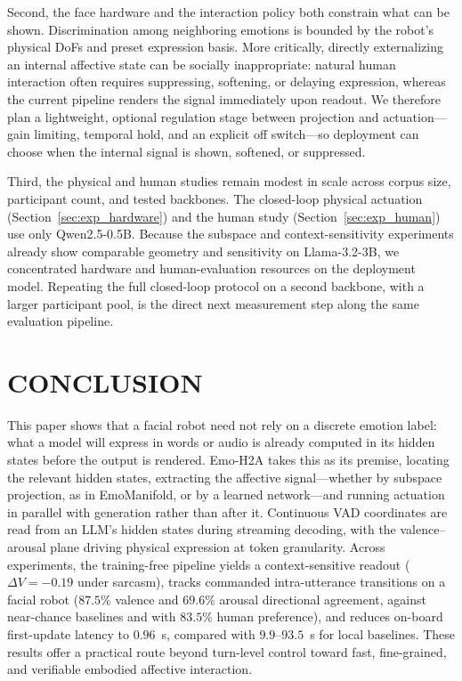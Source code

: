\documentclass[letterpaper, 10 pt, conference]{ieeeconf}
\begin{document}
\addtolength{\textheight}{-4.5cm}

Second, the face hardware and the interaction policy both constrain what can be shown. Discrimination among neighboring emotions is bounded by the robot's physical DoFs and preset expression basis. More critically, directly externalizing an internal affective state can be socially inappropriate: natural human interaction often requires suppressing, softening, or delaying expression, whereas the current pipeline renders the signal immediately upon readout. We therefore plan a lightweight, optional regulation stage between projection and actuation---gain limiting, temporal hold, and an explicit off switch---so deployment can choose when the internal signal is shown, softened, or suppressed.

Third, the physical and human studies remain modest in scale across corpus size, participant count, and tested backbones. The closed-loop physical actuation (Section~\ref{sec:exp_hardware}) and the human study (Section~\ref{sec:exp_human}) use only Qwen2.5-0.5B. Because the subspace and context-sensitivity experiments already show comparable geometry and sensitivity on Llama-3.2-3B, we concentrated hardware and human-evaluation resources on the deployment model. Repeating the full closed-loop protocol on a second backbone, with a larger participant pool, is the direct next measurement step along the same evaluation pipeline.

\section{CONCLUSION}
\label{sec:conclusion}

This paper shows that a facial robot need not rely on a discrete emotion label: what a model will express in words or audio is already computed in its hidden states before the output is rendered. Emo-H2A takes this as its premise, locating the relevant hidden states, extracting the affective signal---whether by subspace projection, as in EmoManifold, or by a learned network---and running actuation in parallel with generation rather than after it. Continuous VAD coordinates are read from an LLM's hidden states during streaming decoding, with the valence--arousal plane driving physical expression at token granularity. Across experiments, the training-free pipeline yields a context-sensitive readout ($\Delta V{=}-0.19$ under sarcasm), tracks commanded intra-utterance transitions on a facial robot ($87.5\%$ valence and $69.6\%$ arousal directional agreement, against near-chance baselines and with $83.5\%$ human preference), and reduces on-board first-update latency to $0.96$~s, compared with $9.9$--$93.5$~s for local baselines. These results offer a practical route beyond turn-level control toward fast, fine-grained, and verifiable embodied affective interaction.



\end{document}
